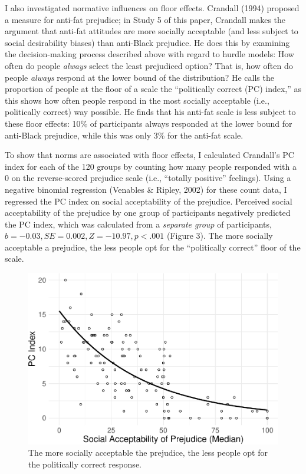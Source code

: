 \documentclass[english,,man]{apa6}
\begin{document}
I also investigated normative influences on floor effects. Crandall (1994) proposed a measure for anti-fat prejudice; in Study 5 of this paper, Crandall makes the argument that anti-fat attitudes are more socially acceptable (and less subject to social desirability biases) than anti-Black prejudice. He does this by examining the decision-making process described above with regard to hurdle models: How often do people \emph{always} select the least prejudiced option? That is, how often do people \emph{always} respond at the lower bound of the distribution? He calls the proportion of people at the floor of a scale the \enquote{politically correct (PC) index,} as this shows how often people respond in the most socially acceptable (i.e., politically correct) way possible. He finds that his anti-fat scale is less subject to these floor effects: 10\% of participants always responded at the lower bound for anti-Black prejudice, while this was only 3\% for the anti-fat scale.

To show that norms are associated with floor effects, I calculated Crandall's PC index for each of the 120 groups by counting how many people responded with a 0 on the reverse-scored prejudice scale (i.e., \enquote{totally positive} feelings). Using a negative binomial regression (Venables \& Ripley, 2002) for these count data, I regressed the PC index on social acceptability of the prejudice. Perceived social acceptability of the prejudice by one group of participants negatively predicted the PC index, which was calculated from a \emph{separate group} of participants, \(b = -0.03, SE = 0.002, Z = -10.97, p < .001\) (Figure 3). The more socially acceptable a prejudice, the less people opt for the \enquote{politically correct} floor of the scale.

\begin{figure}
\centering
\includegraphics{beta_hurdle_files/figure-latex/unnamed-chunk-4-1.pdf}
\caption{\label{fig:unnamed-chunk-4}The more socially acceptable the prejudice, the less people opt for the politically correct response.}
\end{figure}
\end{document}
